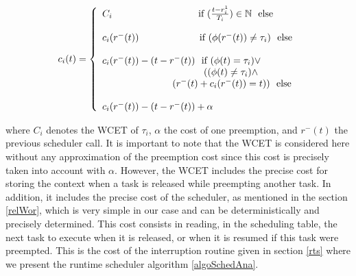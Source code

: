 \documentclass[conference,compsocconf]{IEEEtran}
\begin{document}
\begin{equation*}
       c_i(t)= \left\{
            \begin{array}{ll}
C_i   \ \ \ \ \ \ \ \ \ \ \ \ \ \ \ \ \ \ \  \ \ \ \ \ \ \  \ \mbox{if
  $(\frac{t-r_i^1}{T_i}) \in \mathbb{N} \ $  else} \\ 
\\
             c_i(r^{-}(t))   \ \ \ \ \ \ \ \ \ \ \ \ \ \ \ \ \ \ \
             \mbox{if $(\phi(r^{-}(t)) \neq \tau_i) \ $ else} \\ 
\\
           c_i(r^{-}(t))-(t-r^{-}(t)) \ \ \mbox{if $(\phi(t)=\tau_i) \vee $ }\\

\mbox{$\ \ \ \; \ \ \ \ \   \ \ \ \ \ \ \ \  \ \ \ \ \ \ \ \
   \  \ \ \ \ \ \  ((\phi(t) \neq \tau_i) \wedge$}\\


 \mbox{$ \ \ \ \ \ \ \ \ \ \ \ \ \ \ \ \ \ \ \ \ \ \ (r^{-}(t)+c_i(r^{-}(t))= t))
   \ $ else}\\  
 \\

             c_i(r^{-}(t))-(t-r^{-}(t))+\alpha \ \ \  \mbox{} 
            \end{array}
          \right.
\end{equation*}

where $C_i$ denotes the WCET of $\tau_i$, $\alpha$ the cost of one preemption,
and $r^{-}(t)$ the previous scheduler call. It is important to note that the
WCET is considered here without any approximation of the preemption cost since
this cost is precisely taken into account with $\alpha$. However, the WCET
includes the precise cost for storing the context when a task is released while
preempting another task. In addition, it includes the precise cost of the
scheduler, as mentioned in the section \ref{relWor}, which is very simple in
our case and can be deterministically and precisely determined. This cost
consists in reading, in the scheduling table, the next task to execute when it
is released, or when it is resumed if this task were preempted. This is the
cost of the interruption routine given in section \ref{rts} where we present
the runtime scheduler algorithm \ref{algoSchedAna}.
\end{document}
